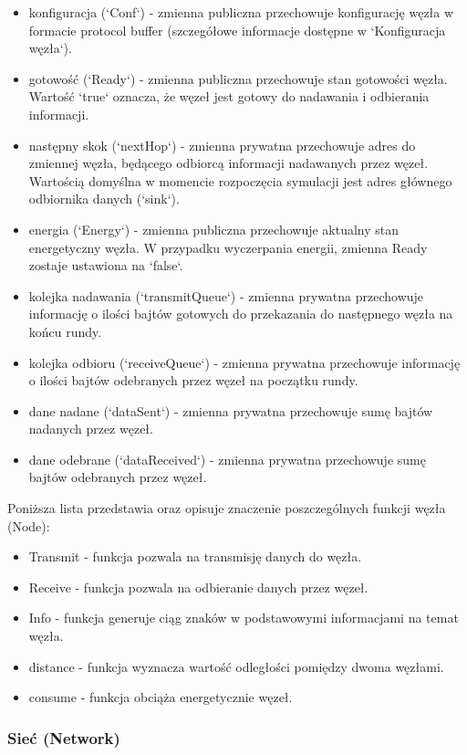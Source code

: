 \documentclass[a4paper,12pt,twoside,openany]{report}
\begin{document}
\begin{itemize}
 \item konfiguracja (`Conf`) - zmienna publiczna przechowuje konfigurację węzła w formacie protocol buffer (szczegółowe informacje dostępne w `Konfiguracja węzła`).
 \item gotowość (`Ready`) - zmienna publiczna przechowuje stan gotowości węzła. Wartość `true` oznacza, że węzeł jest gotowy do nadawania i odbierania informacji.
 \item następny skok (`nextHop`) - zmienna prywatna przechowuje adres do zmiennej węzła, będącego odbiorcą informacji nadawanych przez węzeł. Wartością domyślna w momencie
       rozpoczęcia symulacji jest adres głównego odbiornika danych (`sink`).
 \item energia (`Energy`) - zmienna publiczna przechowuje aktualny stan energetyczny węzła. W przypadku wyczerpania energii, zmienna Ready zostaje ustawiona na `false`.
 \item kolejka nadawania (`transmitQueue`) - zmienna prywatna przechowuje informację o ilości bajtów gotowych do przekazania do następnego węzła na końcu rundy.
 \item kolejka odbioru (`receiveQueue`) - zmienna prywatna przechowuje informację o ilości bajtów odebranych przez węzeł na początku rundy.
 \item dane nadane (`dataSent`) - zmienna prywatna przechowuje sumę bajtów nadanych przez węzeł.
 \item dane odebrane (`dataReceived`) - zmienna prywatna przechowuje sumę bajtów odebranych przez węzeł.
\end{itemize}

Poniższa lista przedstawia oraz opisuje znaczenie poszczególnych funkcji węzła (Node):

\begin{itemize}
 \item Transmit - funkcja pozwala na transmisję danych do węzła.
 \item Receive - funkcja pozwala na odbieranie danych przez węzeł.
 \item Info - funkcja generuje ciąg znaków w podstawowymi informacjami na temat węzła.
 \item distance - funkcja wyznacza wartość odległości pomiędzy dwoma węzłami.
 \item consume - funkcja obciąża energetycznie węzeł.
\end{itemize}

\subsubsection{Sieć (Network)}
\end{document}
